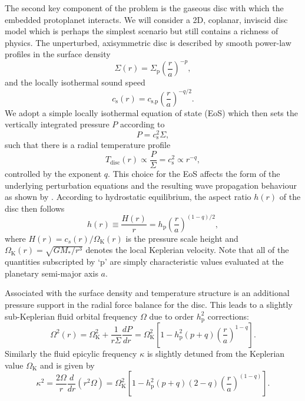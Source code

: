 The second key component of the problem is the gaseous disc with which the embedded protoplanet interacts. We will consider a 2D, coplanar, inviscid disc model which is perhaps the simplest scenario but still contains a richness of physics. The unperturbed, axisymmetric disc is described by smooth power-law profiles in the surface density
%
\begin{equation}
    \label{eqn:surface_density}
    \Sigma(r) = \Sigma_{\textrm{p}}\left(\frac{r}{a}\right)^{-p} ,
\end{equation}
%
and the locally isothermal sound speed 
%
\begin{equation}
    \label{eqn:sound_speed}
    c_\textrm{s} (r) = c_{\textrm{s},\textrm{p}}\left(\frac{r}{a}\right)^{-q/2}.
\end{equation}
%
We adopt a simple locally isothermal equation of state (EoS) which then sets the vertically integrated pressure $P$ according to 
%
\begin{equation}
    \label{eqn:eos}
    P = c_{\textrm{s}}^2 \Sigma ,
\end{equation}
%
such that there is a radial temperature profile
%
\begin{equation}
    \label{eqn:temperature}
    T_\textrm{disc}(r) \propto \frac{P}{\Sigma} = c_\textrm{s}^2 \propto r^{-q},
\end{equation}
%
controlled by the exponent $q$. This choice for the EoS affects the form of the underlying perturbation equations and the resulting wave propagation behaviour as shown by \cite{MirandaRafikov_2020}. According to hydrostatic equilibrium, the aspect ratio $h(r)$ of the disc then follows
%
\begin{equation}
    \label{eqn:aspect_ratio}
    h(r) \equiv \frac{H(r)}{r} = h_\textrm{p} \left(\frac{r}{a}\right)^{(1-q)/2},
\end{equation}
%
where $H(r) = c_s(r)/\Omega_\textrm{K}(r) $ is the pressure scale height and $\Omega_\textrm{K}(r) = \sqrt{GM_{*}/r^3}$ denotes the local Keplerian velocity. Note that all of the quantities subscripted by `$\textrm{p}$' are simply characteristic values evaluated at the planetary semi-major axis $a$. 

Associated with the surface density and temperature structure is an additional pressure support in the radial force balance for the disc. This leads to a slightly sub-Keplerian fluid orbital frequency $\Omega$ due to order $h_{\textrm{p}}^2$ corrections:
%
\begin{equation}
    \label{eqn:fluid_frequency}
    \Omega^2(r) = \Omega_\textrm{K}^2+\frac{1}{r \Sigma}\frac{dP}{dr}=\Omega_\textrm{K}^2\left[1-h_\textrm{p}^2(p+q)\left(\frac{r}{a}\right)^{1-q}\right].
\end{equation}
%
Similarly the fluid epicylic frequency $\kappa$ is slightly detuned from the Keplerian value $\Omega_\textrm{K}$ and is given by
%
\begin{equation}
    \kappa^2 = \frac{2\Omega}{r}\frac{d}{dr}\left(r^2\Omega\right) = \Omega_\textrm{K}^2\left[1-h_\textrm{p}^2(p+q)(2-q)\left(\frac{r}{a}\right)^{(1-q)}\right].
\end{equation}

